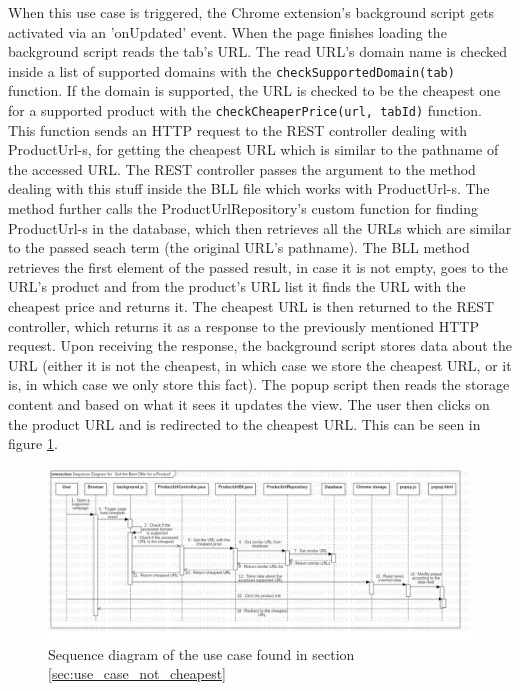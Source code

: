\documentclass[12pt,a4paper,twoside]{report}
\begin{document}
When this use case is triggered, the Chrome extension's background script gets activated via an 'onUpdated' event. When the page finishes loading the background script reads the tab's URL. The read URL's domain name is checked inside a list of supported domains with the \lstinline$checkSupportedDomain(tab)$ function. If the domain is supported, the URL is checked to be the cheapest one for a supported product with the \lstinline$checkCheaperPrice(url, tabId)$ function. This function sends an HTTP request to the REST controller dealing with ProductUrl-s, for getting the cheapest URL which is similar to the pathname of the accessed URL. The REST controller passes the argument to the method dealing with this stuff inside the BLL file which works with ProductUrl-s. The method further calls the ProductUrlRepository's custom function for finding ProductUrl-s in the database, which then retrieves all the URLs which are similar to the passed seach term (the original URL's pathname). The BLL method retrieves the first element of the passed result, in case it is not empty, goes to the URL's product and from the product's URL list it finds the URL with the cheapest price and returns it. The cheapest URL is then returned to the REST controller, which returns it as a response to the previously mentioned HTTP request. Upon receiving the response, the background script stores data about the URL (either it is not the cheapest, in which case we store the cheapest URL, or it is, in which case we only store this fact). The popup script then reads the storage content and based on what it sees it updates the view. The user then clicks on the product URL and is redirected to the cheapest URL. This can be seen in figure \ref{fig:sequence_not_cheapest_offer}.

\begin{figure}[ht]
  \centering
  \includegraphics[width=\linewidth]{img/sequence_not_cheapest_offer.png}
  \caption{Sequence diagram of the use case found in section \ref{sec:use_case_not_cheapest}}
  \label{fig:sequence_not_cheapest_offer}
\end{figure}
\end{document}
